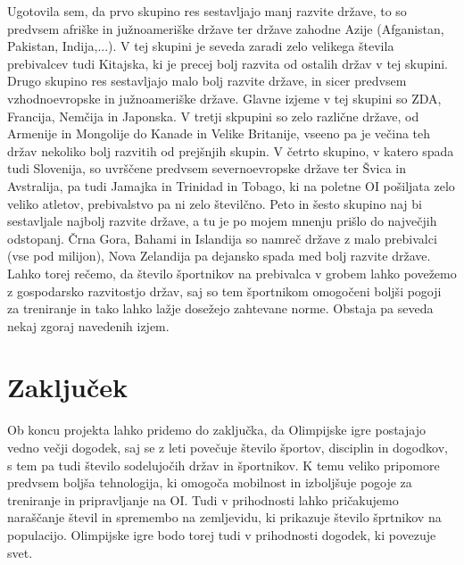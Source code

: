 \documentclass[11pt,a4paper]{article}
\begin{document}
\begin{enumerate}
{\newline
Ugotovila sem, da prvo skupino res sestavljajo manj razvite države, to so predvsem afriške in južnoameriške države ter države zahodne Azije (Afganistan, Pakistan, Indija,...). V tej skupini je seveda zaradi zelo velikega števila prebivalcev tudi Kitajska, ki je precej bolj razvita od ostalih držav v tej skupini. Drugo skupino res sestavljajo malo bolj razvite države, in sicer predvsem vzhodnoevropske in južnoameriške države. Glavne izjeme v tej skupini so ZDA, Francija, Nemčija in Japonska. V tretji skpupini so zelo različne države, od Armenije in Mongolije do Kanade in Velike Britanije, vseeno pa je večina teh držav nekoliko bolj razvitih od prejšnjih skupin. V četrto skupino, v katero spada tudi Slovenija, so uvrščene predvsem severnoevropske države ter Švica in Avstralija, pa tudi Jamajka in Trinidad in Tobago, ki na poletne OI pošiljata zelo veliko atletov, prebivalstvo pa ni zelo številčno. Peto in šesto skupino naj bi sestavljale najbolj razvite države, a tu je po mojem mnenju prišlo do največjih odstopanj. Črna Gora, Bahami in Islandija so namreč države z malo prebivalci (vse pod milijon), Nova Zelandija pa dejansko spada med bolj razvite države.
\newline
Lahko torej rečemo, da število športnikov na prebivalca v grobem lahko povežemo z gospodarsko razvitostjo držav, saj so tem športnikom omogočeni boljši pogoji za treniranje in tako lahko lažje dosežejo zahtevane norme. Obstaja pa seveda nekaj zgoraj navedenih izjem.
}
\end{enumerate}


\section{Zaključek}
Ob koncu projekta lahko pridemo do zaključka, da Olimpijske igre postajajo vedno večji dogodek, saj se z leti povečuje število športov, disciplin in dogodkov, s tem pa tudi število sodelujočih držav in športnikov. K temu veliko pripomore predvsem boljša tehnologija, ki omogoča mobilnost in izboljšuje pogoje za treniranje in pripravljanje na OI. Tudi v prihodnosti lahko pričakujemo naraščanje števil in spremembo na zemljevidu, ki prikazuje število šprtnikov na populacijo. Olimpijske igre bodo torej tudi v prihodnosti dogodek, ki povezuje svet.
\end{document}
